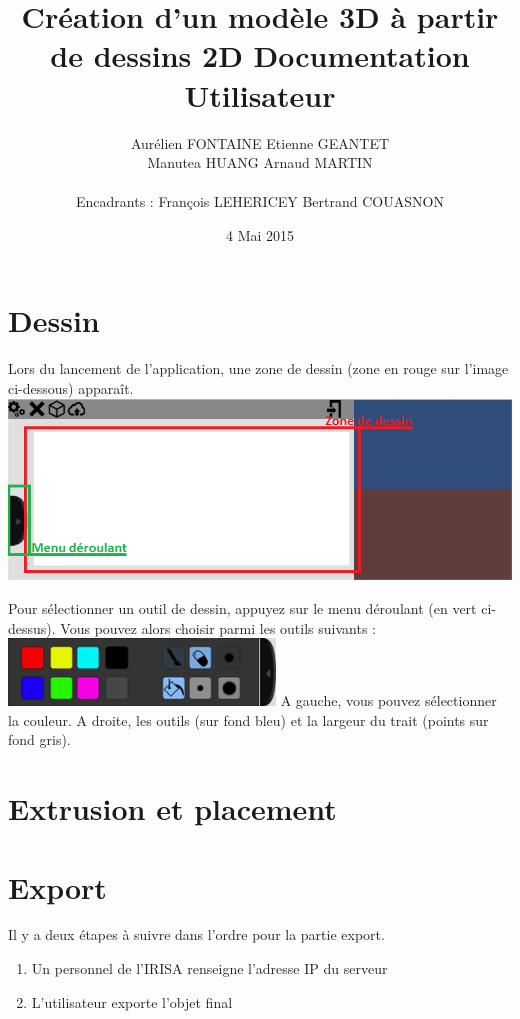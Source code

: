 \documentclass[a4paper,11pt]{article}
\title{ \textbf{Création d'un modèle 3D à partir de dessins 2D Documentation Utilisateur} }
\author{ Aurélien \textsc{FONTAINE} Etienne \textsc{GEANTET} \\
	Manutea \textsc{HUANG} Arnaud \textsc{MARTIN} \\
	\\
	Encadrants : François \textsc{LEHERICEY}	Bertrand \textsc{COUASNON}}
\date{4 Mai 2015}                    %
\begin{document}
\maketitle                 %
\thispagestyle{empty}      %

\tableofcontents


\section{Dessin}
	Lors du lancement de l'application, une zone de dessin (zone en rouge sur l'image ci-dessous) apparaît. 
	\includegraphics[scale=0.6]{./images/zonedessin.png}
	
	Pour sélectionner un outil de dessin, appuyez sur le menu déroulant (en vert ci-dessus). Vous pouvez alors choisir parmi les outils suivants :
	\includegraphics[scale=0.6]{./images/img7.png}
	A gauche, vous pouvez sélectionner la couleur.
	A droite, les outils (sur fond bleu) et la largeur du trait (points sur fond gris).
	
	
\section{Extrusion et placement}

\section{Export}
	Il y a deux étapes à suivre dans l'ordre pour la partie export.
	\begin{enumerate}
		\item Un personnel de l'IRISA renseigne l'adresse IP du serveur
		\item L'utilisateur exporte l'objet final
	\end{enumerate}
\end{document}
